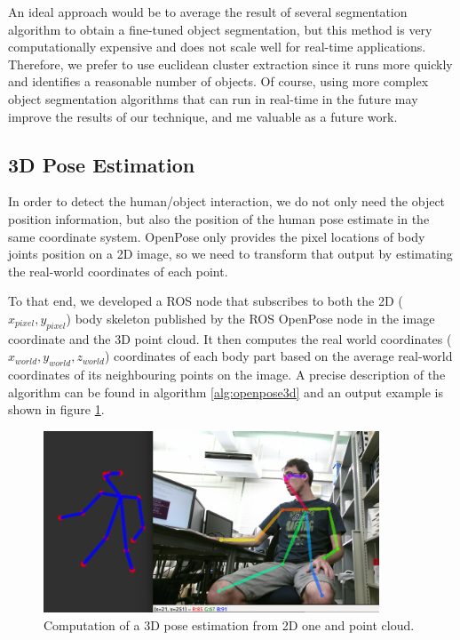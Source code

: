 An ideal approach would be to average the result of several segmentation algorithm to obtain a fine-tuned object segmentation, but this method is very computationally expensive and does not scale well for real-time applications. Therefore, we prefer to use euclidean cluster extraction since it runs more quickly and identifies a reasonable number of objects. Of course, using more complex object segmentation algorithms that can run in real-time in the future may improve the results of our technique, and me valuable as a future work.

\subsection{3D Pose Estimation}
In order to detect the human/object interaction, we do not only need the object position information, but also the position of the human pose estimate in the same coordinate system. OpenPose only provides the pixel locations of body joints position on a 2D image, so we need to transform that output by estimating the real-world coordinates of each point.

To that end, we developed a ROS node that subscribes to both the 2D ($x_{pixel}, y_{pixel}$) body skeleton published by the ROS OpenPose node in the image coordinate and the 3D point cloud. It then computes the real world coordinates ($x_{world}, y_{world}, z_{world}$) coordinates of each body part based on the average real-world coordinates of its neighbouring points on the image. A precise description of the algorithm can be found in algorithm \ref{alg:openpose3d} and an output example is shown in figure \ref{fig:openpose3d}.

\begin{figure}[htp]
\centering
\includegraphics[width=100mm, keepaspectratio]{images/openpose3d.png}
\caption{Computation of a 3D pose estimation from 2D one and point cloud.}
\label{fig:openpose3d}
\end{figure}

